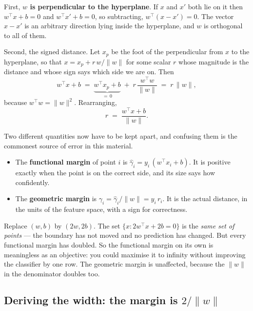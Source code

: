 \documentclass[11pt]{article}
\begin{document}
First, \textbf{$w$ is perpendicular to the hyperplane}. If $x$ and $x'$ both
lie on it then $w^\top x + b = 0$ and $w^\top x' + b = 0$, so subtracting,
$w^\top(x - x') = 0$. The vector $x - x'$ is an arbitrary direction lying
inside the hyperplane, and $w$ is orthogonal to all of them.

Second, the signed distance. Let $x_p$ be the foot of the perpendicular from
$x$ to the hyperplane, so that $x = x_p + r\,w/\|w\|$ for some scalar $r$ whose
magnitude is the distance and whose sign says which side we are on. Then
\[
  w^\top x + b
  \;=\; \underbrace{w^\top x_p + b}_{=\,0}
        \;+\; r\,\frac{w^\top w}{\|w\|}
  \;=\; r\,\|w\| ,
\]
because $w^\top w = \|w\|^2$. Rearranging,
\begin{equation}
  r \;=\; \frac{w^\top x + b}{\|w\|} .
  \label{eq:signeddist}
\end{equation}

Two different quantities now have to be kept apart, and confusing them is the
commonest source of error in this material.

\begin{itemize}[leftmargin=*]
  \item The \textbf{functional margin} of point $i$ is
    $\hat\gamma_i = y_i\,(w^\top x_i + b)$. It is positive exactly when the
    point is on the correct side, and its size says how confidently.
  \item The \textbf{geometric margin} is
    $\gamma_i = \hat\gamma_i / \|w\| = y_i\,r_i$. It is the actual distance,
    in the units of the feature space, with a sign for correctness.
\end{itemize}

\begin{caution}
Replace $(w,b)$ by $(2w,2b)$. The set $\{x : 2w^\top x + 2b = 0\}$ is the
\emph{same set of points} --- the boundary has not moved and no prediction has
changed. But every functional margin has doubled. So the functional margin on
its own is meaningless as an objective: you could maximise it to infinity
without improving the classifier by one row. The geometric margin is
unaffected, because the $\|w\|$ in the denominator doubles too.
\end{caution}

\subsection{Deriving the width: the margin is $2/\|w\|$}
\label{sec:derive}
\end{document}
